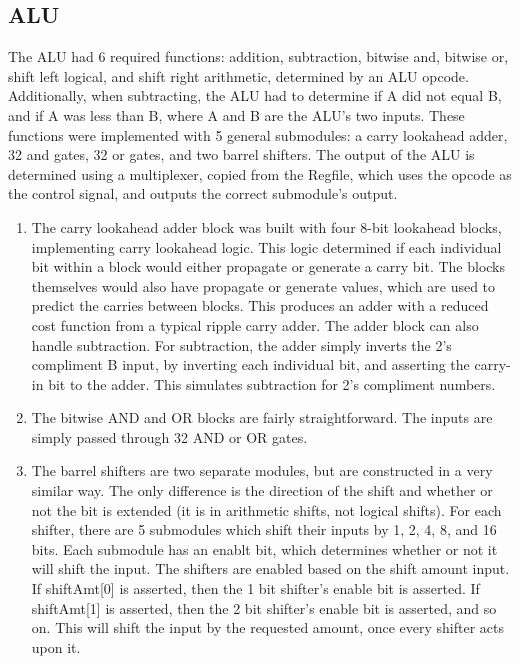 \documentclass[letterpaper]{article} %
\begin{document}
\subsection*{ALU}
The ALU had 6 required functions: addition, subtraction, bitwise and, bitwise or, shift left logical, and shift right arithmetic, determined by an ALU opcode. Additionally, when subtracting, the ALU had to determine if A did not equal B, and if A was less than B, where A and B are the ALU's two inputs. These functions were implemented with 5 general submodules: a carry lookahead adder, 32 and gates, 32 or gates, and two barrel shifters. The output of the ALU is determined using a multiplexer, copied from the Regfile, which uses the opcode as the control signal, and outputs the correct submodule's output.  \\
\begin{enumerate}
\item The carry lookahead adder block was built with four 8-bit lookahead blocks, implementing carry lookahead logic. This logic determined if each individual bit within a block would either propagate or generate a carry bit. The blocks themselves would also have propagate or generate values, which are used to predict the carries between blocks. This produces an adder with a reduced cost function from a typical ripple carry adder. The adder block can also handle subtraction. For subtraction, the adder simply inverts the 2's compliment B input, by inverting each individual bit, and asserting the carry-in bit to the adder. This simulates subtraction for 2's compliment numbers. \\
\item The bitwise AND and OR blocks are fairly straightforward. The inputs are simply passed through 32 AND or OR gates. \\
\item The barrel shifters are two separate modules, but are constructed in a very similar way. The only difference is the direction of the shift and whether or not the bit is extended (it is in arithmetic shifts, not logical shifts). For each shifter, there are 5 submodules which shift their inputs by 1, 2, 4, 8, and 16 bits. Each submodule has an enablt bit, which determines whether or not it will shift the input. The shifters are enabled based on the shift amount input. If shiftAmt[0] is asserted, then the 1 bit shifter's enable bit is asserted. If shiftAmt[1] is asserted, then the 2 bit shifter's enable bit is asserted, and so on. This will shift the input by the requested amount, once every shifter acts upon it. \\

\end{enumerate}
\end{document}
